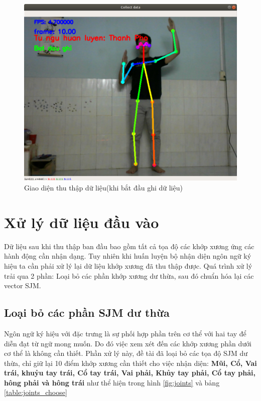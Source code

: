 \FloatBarrier
\begin{figure}[htp]
\begin{center}
\includegraphics[scale=0.4]{chap4/c4_figs/collect_data.png}
\end{center}
\caption{Giao diện thu thập dữ liệu(khi bắt đầu ghi dữ liệu)}
\label{fig:collect_data}
\end{figure}
\FloatBarrier

\newpage


\section{Xử lý dữ liệu đầu vào}
Dữ liệu sau khi thu thập ban đầu bao gồm tất cả tọa độ các khớp xương ứng các hành động cần nhận dạng. Tuy nhiên khi huấn luyện bộ nhận diện ngôn ngữ ký hiệu ta cần phải xử lý lại dữ liệu khớp xương đã thu thập được. Quá trình xử lý trải qua 2 phần: Loại bỏ các phần khớp xương dư thừa, sau đó chuẩn hóa lại các vector SJM.

\subsection{Loại bỏ các phần SJM dư thừa}
Ngôn ngữ ký hiệu với đặc trưng là sự phối hợp phần trên cơ thể với hai tay để diễn đạt từ ngữ mong muốn. Do đó việc xem xét đến các khớp xương phần dưới cơ thể là không cần thiết. Phần xử lý này, đề tài đã loại bỏ các tọa độ SJM dư thừa, chỉ giữ lại 10 điểm khớp xương cần thiết cho việc nhận diện: \textbf{Mũi, Cổ, Vai trái, khuỷu tay trái, Cổ tay trái, Vai phải, Khủy tay phải, Cổ tay phải, hông phải và hông trái} như thể hiện trong hình \ref{fig:joints} và bảng \ref{table:joints_choose}

